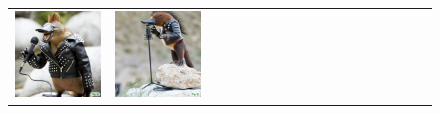\begin{figure}[ht!]
\begin{adjustwidth}{-0.8in}{-0.5in}
\begin{tabular}{cccccccccccccccccccc}
\multicolumn{2}{c}{\includegraphics[width=\threebythreecolwidth\textwidth]{figures/cherries/rock_platypus_0.jpg}} &
\multicolumn{2}{c}{\includegraphics[width=\threebythreecolwidth\textwidth]{figures/cherries/rock_platypus_1.jpg}} &

\end{tabular}
\end{adjustwidth}
\end{figure}
